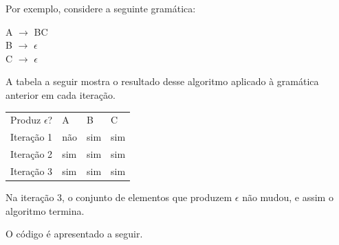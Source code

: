 \documentclass[11pt]{article}
\begin{document}
Por exemplo, considere a seguinte gramática:

\begin{center}
A \(\rightarrow\) BC \\
B \(\rightarrow\) \(\epsilon\) \\
C \(\rightarrow\) \(\epsilon\)
\end{center}

A tabela a seguir mostra o resultado desse algoritmo aplicado à gramática
anterior em cada iteração.

\begin{center}
\begin{tabular}{llll}
Produz \(\epsilon\)? & A & B & C\\
Iteração 1 & não & sim & sim\\
Iteração 2 & sim & sim & sim\\
Iteração 3 & sim & sim & sim\\
\end{tabular}
\end{center}

Na iteração 3, o conjunto de elementos que produzem \(\epsilon\) não mudou, e assim
o algoritmo termina.

O código é apresentado a seguir.
\end{document}
